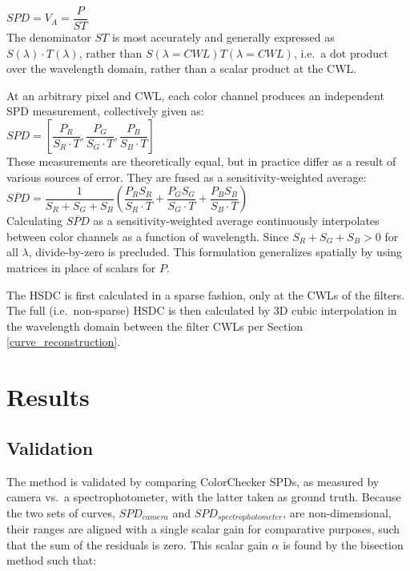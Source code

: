 \documentclass[twocolumn,10pt]{asme2ej}
\newcommand{\id}{\hspace{6 mm}}
\begin{document}
 $SPD = V_A = \dfrac{P}{ST}$ \\

The denominator $ST$ is most accurately and generally expressed as $S(\lambda) \cdot T(\lambda)$, rather than $S(\lambda=CWL) T(\lambda=CWL)$, i.e.\ a dot product over the wavelength domain, rather than a scalar product at the CWL.

\id At an arbitrary pixel and CWL, each color channel produces an independent SPD measurement, collectively given as: \\

 $SPD = \left[ \dfrac{P_R}{S_R \cdot T},\dfrac{P_G}{S_G \cdot T},\dfrac{P_B}{S_B \cdot T} \right] $ \\

These measurements are theoretically equal, but in practice differ as a result of various sources of error. They are fused as a sensitivity-weighted average: \\

$\overline{SPD} = \dfrac{1}{S_R+S_G+S_B} \left( \dfrac{P_R S_R}{S_R \cdot T} + \dfrac{P_G S_G}{S_G \cdot T} + \dfrac{P_B S_B}{S_B \cdot T} \right)$\\

Calculating $\overline{SPD}$ as a sensitivity-weighted average continuously interpolates between color channels as a function of wavelength. Since $S_R+S_G+S_B > 0$ for all $\lambda$, divide-by-zero is precluded. This formulation generalizes spatially by using matrices in place of scalars for $P$.

\id The HSDC is first calculated in a sparse fashion, only at the CWLs of the filters. The full (i.e.\ non-sparse) HSDC is then calculated by 3D cubic interpolation in the wavelength domain between the filter CWLs per Section \ref{curve_reconstruction}.

\section{Results}
\subsection{Validation}
\label{validation}

The method is validated by comparing ColorChecker SPDs, as measured by camera vs.\ a spectrophotometer, with the latter taken as ground truth. Because the two sets of curves, $SPD_{camera}$ and $SPD_{spectrophotometer}$, are non-dimensional, their ranges are aligned with a single scalar gain for comparative purposes, such that the sum of the residuals is zero. This scalar gain $\alpha$ is found by the bisection method such that:\\
\end{document}
